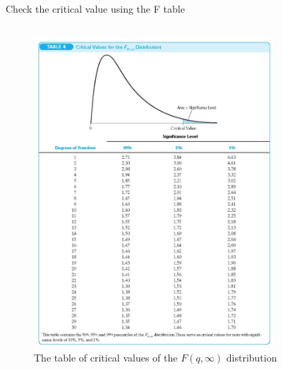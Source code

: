 \documentclass[presentation,10pt]{beamer}
\begin{document}
\begin{frame}[label={sec:org6aafe07}]{Check the critical value using the F table}
\begin{columns}
\begin{column}{0.5\columnwidth}
\begin{figure}[htbp]
\centering
\includegraphics[width=0.8\textwidth]{img/fdist.png}
\caption{The table of critical values of the \(F(q, \infty)\) distribution}
\end{figure}
\end{column}


\end{columns}
\end{frame}
\end{document}
